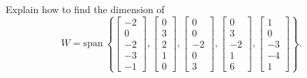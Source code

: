 \documentclass{article}
\begin{document}
\begin{exerciseStatement}
    Explain how to find the dimension of
\[W=\mathrm{span}\ \left\{\left[\begin{array}{r}
-2 \\
0 \\
-2 \\
-3 \\
-1
\end{array}\right] , \left[\begin{array}{r}
0 \\
3 \\
2 \\
1 \\
0
\end{array}\right] , \left[\begin{array}{r}
0 \\
0 \\
-2 \\
0 \\
3
\end{array}\right] , \left[\begin{array}{r}
0 \\
3 \\
-2 \\
1 \\
6
\end{array}\right] , \left[\begin{array}{r}
1 \\
0 \\
-3 \\
-4 \\
1
\end{array}\right]\right\}.\]



  
\end{exerciseStatement}
\end{document}
